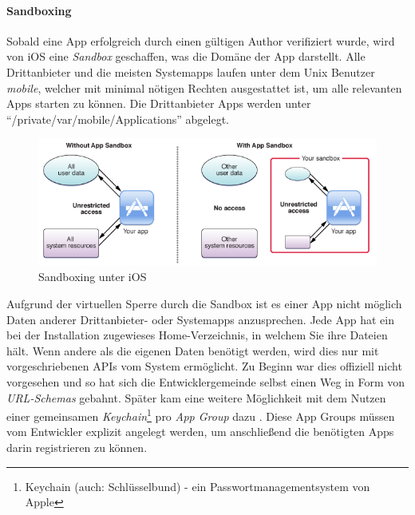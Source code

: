 		\paragraph{Sandboxing}\label{sec:sandboxing}
			Sobald eine App erfolgreich durch einen gültigen Author verifiziert wurde,
			wird von iOS eine \textsl{Sandbox} geschaffen, was die Domäne der App
			darstellt. Alle Drittanbieter und die meisten Systemapps laufen unter dem
			Unix Benutzer \textsl{mobile}, welcher mit minimal nötigen Rechten
			ausgestattet ist, um alle relevanten Apps starten zu können. Die
			Drittanbieter Apps werden unter "`/private/var/mobile/Applications"'
			abgelegt.
			\begin{figure}[h]
				\centering
				\includegraphics[width=0.9\linewidth]{ios/media/sandboxing.png}
				\caption{Sandboxing unter iOS 
				\cite{IOSSandboxing}}
				\label{fig:sandboxing}
			\end{figure}
			Aufgrund der virtuellen Sperre durch die Sandbox ist es einer App nicht
			möglich Daten anderer Drittanbieter- oder Systemapps anzusprechen. Jede App
			hat ein bei der Installation zugewieses Home-Verzeichnis, in
			welchem Sie ihre Dateien hält. Wenn andere als die eigenen Daten benötigt
			werden, wird dies nur mit vorgeschriebenen APIs vom System ermöglicht. Zu
			Beginn war dies offiziell nicht vorgesehen und so hat sich die
			Entwicklergemeinde selbst einen Weg in Form von \textsl{URL-Schemas}
			gebahnt. Später kam eine weitere Möglichkeit mit dem Nutzen einer
			gemeinsamen \textsl{Keychain}\footnote{Keychain (auch: Schlüsselbund) - ein
			Passwortmanagementsystem von Apple} pro \textsl{App Group} dazu \cite[S.
			83]{Banks2015}.
			Diese App Groups müssen vom Entwickler explizit angelegt werden, um anschließend die benötigten Apps darin registrieren zu
			können.
				
